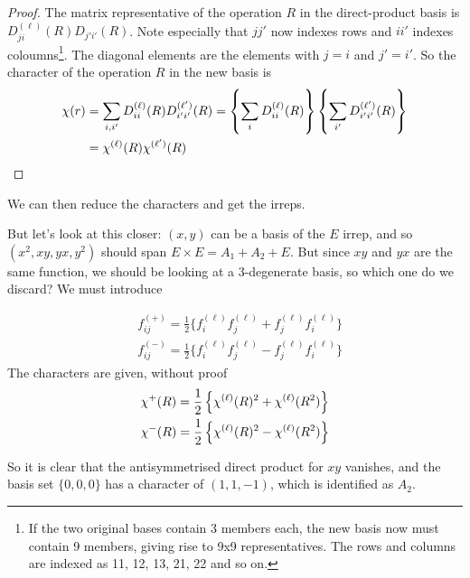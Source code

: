 \begin{proof}
The matrix representative of the operation $R$ in the direct-product basis is \\$D_{ji}^{(\ell)}(R)D_{j'i'}(R)$. Note especially that $jj'$ now indexes rows and $ii'$ indexes coloumns\footnote{If the two original bases contain 3 members each, the new basis now must contain 9 members, giving rise to 9x9 representatives. The rows and columns are indexed as 11, 12, 13, 21, 22 and so on.}. The diagonal elements are the elements with $j=i$ and $j'=i'$. So the character of the operation $R$ in the new basis is
\begin{equation}
\begin{aligned}
\chi(r)&=\sum_{i,i'}D_{ii}^{(\ell)}(R)D_{i'i'}^{(\ell')}(R)=\left\{\sum_iD_{ii}^{(\ell)}(R) \right\}\left\{\sum_{i'}D_{i'i'}^{(\ell')}(R) \right\}\\
&=\chi^{(\ell)}(R)\chi^{(\ell')}(R)
\end{aligned}
\end{equation}
\end{proof}
We can then reduce the characters and get the irreps. \par
But let's look at this closer: $(x,y)$ can be a basis of the $E$ irrep, and so 
$(x^2,xy,yx,y^2)$ should span $E\times E=A_1+A_2+E$. But since $xy$ and $yx$ are the same function, we should be looking at a 3-degenerate basis, so which one do we discard? We must introduce 
\begin{prt}
\begin{subequations}
\begin{align}
&f_{ij}^{(+)}=\frac{1}{2}\{f_i^{(\ell)}f_j^{(\ell)}+f_j^{(\ell)}f_i^{(\ell)} \}\\
&f_{ij}^{(-)}=\frac{1}{2}\{f_i^{(\ell)}f_j^{(\ell)}-f_j^{(\ell)}f_i^{(\ell)} \}
\end{align}
\end{subequations}
The characters are given, without proof
\begin{subequations}
\begin{align}
&\chi^{+}(R)=\frac{1}{2}\left\{\chi^{(\ell)}(R)^2+\chi^{(\ell)}(R^2) \right\}\\
&\chi^{-}(R)=\frac{1}{2}\left\{\chi^{(\ell)}(R)^2-\chi^{(\ell)}(R^2) \right\}
\end{align}
\end{subequations}
\end{prt}
So it is clear that the antisymmetrised direct product for $xy$ vanishes, and the basis set $\{0,0,0\}$ has a character of $(1,1,-1)$, which is identified as $A_2$. \par
